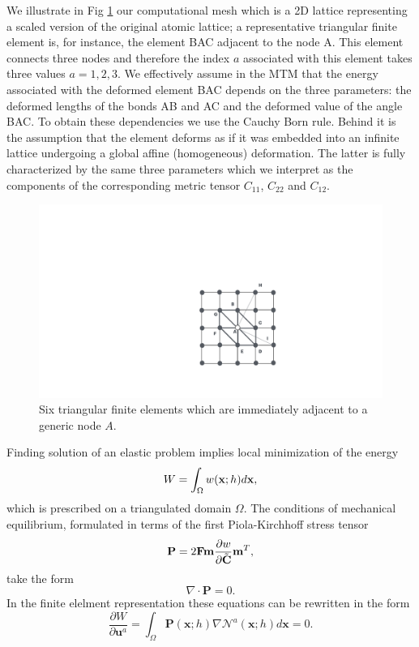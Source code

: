 \documentclass[aps,
superscriptaddress,notitlepage]{revtex4-1}
\begin{document}
We illustrate in Fig \ref{fig_08} our computational mesh which  is  a 2D   lattice representing a scaled version of the  original atomic lattice; a representative  triangular  finite element is, for instance,   the element BAC adjacent to the node A.  This element connects  three nodes and therefore the index $a$  associated with this element takes three values  $a=1,2,3$. We effectively assume in the MTM that the energy associated with  the deformed element BAC depends on the three parameters:  the deformed lengths  of the bonds AB and AC and   the deformed value of the angle BAC. To obtain these dependencies we use the Cauchy Born rule. Behind it is the assumption  that the element deforms as if it was embedded into   an infinite lattice undergoing a global affine (homogeneous) deformation. The latter is   fully characterized by the same three parameters which we interpret as the components of the corresponding metric tensor $C_{11}$, $C_{22}$ and  $C_{12}$.
\begin{figure}[h!]
\centering
\includegraphics[width=0.2\columnwidth]{figures_ordering/figure_06.pdf}
\caption{Six triangular finite elements which are immediately adjacent to a generic   node $A$. }
\label{fig_08}
\end{figure}
Finding  solution of an elastic problem implies  local minimization of the energy 
\begin{equation}
W=\int_{\Omega}w({\bf x}; h)  d\mathbf{x}, 
\end{equation}
which is prescribed on a triangulated  domain \(\Omega\).   The conditions of mechanical equilibrium, formulated   in terms  of the first Piola-Kirchhoff stress tensor 
\begin{equation}
\mathbf{P}= 2\mathbf{F} \mathbf{m} \frac{\partial w }{\partial \tilde{\bf C}}\mathbf{m}^T,
\end{equation} 
take the form 
$$\nabla\cdot\mathbf{P}=0.$$
In the finite elelment representation these  equations can be rewritten in the form
\begin{equation}
\frac{\partial W}{\partial \mathbf{u}^{a}}=\int_{\Omega} \mathbf{P}(\mathbf{x};h) \nabla \mathcal{N}^{a} (\mathbf{x};h) d\mathbf{x} = 0.
\end{equation} 
\end{document}

